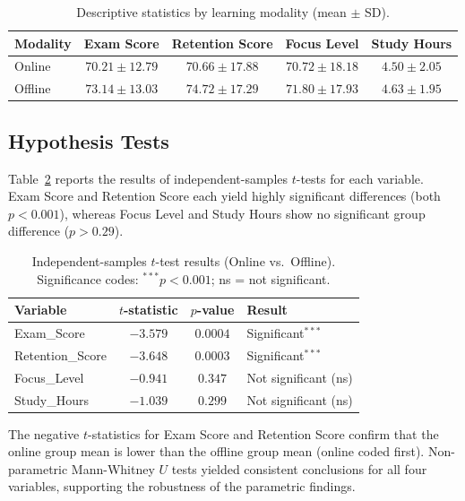 \documentclass[11pt]{article}
\begin{document}
\begin{table}[H]
  \centering
  \caption{Descriptive statistics by learning modality (mean $\pm$ SD).}
  \label{tab:descriptive}
  \begin{tabular}{lcccc}
    \toprule
    \textbf{Modality} & \textbf{Exam Score} & \textbf{Retention Score}
                      & \textbf{Focus Level} & \textbf{Study Hours} \\
    \midrule
    Online  & $70.21 \pm 12.79$ & $70.66 \pm 17.88$ & $70.72 \pm 18.18$ & $4.50 \pm 2.05$ \\
    Offline & $73.14 \pm 13.03$ & $74.72 \pm 17.29$ & $71.80 \pm 17.93$ & $4.63 \pm 1.95$ \\
    \bottomrule
  \end{tabular}
\end{table}

\subsection{Hypothesis Tests}

Table~\ref{tab:htests} reports the results of independent-samples $t$-tests for each
variable. Exam Score and Retention Score each yield highly significant differences
(both $p < 0.001$), whereas Focus Level and Study Hours show no significant group
difference ($p > 0.29$).

\begin{table}[H]
  \centering
  \caption{Independent-samples $t$-test results (Online vs.\ Offline).
           Significance codes: $^{***}p < 0.001$; ns = not significant.}
  \label{tab:htests}
  \begin{tabular}{lccl}
    \toprule
    \textbf{Variable} & \textbf{$t$-statistic} & \textbf{$p$-value}
                      & \textbf{Result} \\
    \midrule
    Exam\_Score      & $-3.579$ & $0.0004$ & Significant$^{***}$ \\
    Retention\_Score & $-3.648$ & $0.0003$ & Significant$^{***}$ \\
    Focus\_Level     & $-0.941$ & $0.347$  & Not significant (ns) \\
    Study\_Hours     & $-1.039$ & $0.299$  & Not significant (ns) \\
    \bottomrule
  \end{tabular}
\end{table}

The negative $t$-statistics for Exam Score and Retention Score confirm that the
online group mean is lower than the offline group mean (online coded first).
Non-parametric Mann-Whitney $U$ tests yielded consistent conclusions for all four
variables, supporting the robustness of the parametric findings.
\end{document}
